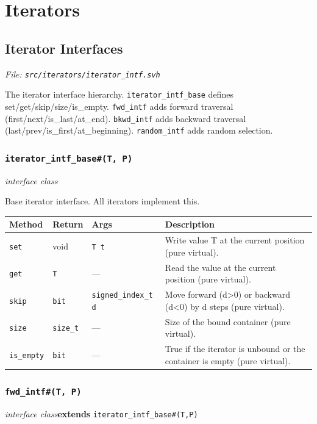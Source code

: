 \documentclass[11pt,letterpaper]{report}
\begin{document}
\chapter{Iterators}
\section{Iterator Interfaces}
\noindent\small\textit{File: \texttt{src/iterators/iterator\_intf.svh}}\par

The iterator interface hierarchy. \texttt{iterator\_intf\_base} defines set/get/skip/size/is\_empty. \texttt{fwd\_intf} adds forward traversal (first/next/is\_last/at\_end). \texttt{bkwd\_intf} adds backward traversal (last/prev/is\_first/at\_beginning). \texttt{random\_intf} adds random selection.

\subsection*{\texttt{iterator\_intf\_base\#(T, P)}}
\noindent\small\textit{interface class}\par

Base iterator interface. All iterators implement this.

\begin{xltabular}{\linewidth}{>{\small}p{1.35in} >{\small}p{1.25in} >{\small}p{0.95in} >{\small}X}
\toprule
\textbf{Method} & \textbf{Return} & \textbf{Args} & \textbf{Description} \\
\midrule
\endhead
\bottomrule
\endfoot
\texttt{set} & void & \texttt{T t} & Write value T at the current position (pure virtual). \\
\texttt{get} & \texttt{T} & --- & Read the value at the current position (pure virtual). \\
\texttt{skip} & \texttt{bit} & \texttt{signed\_index\_t d} & Move forward (d\textgreater{}0) or backward (d\textless{}0) by d steps (pure virtual). \\
\texttt{size} & \texttt{size\_t} & --- & Size of the bound container (pure virtual). \\
\texttt{is\_empty} & \texttt{bit} & --- & True if the iterator is unbound or the container is empty (pure virtual). \\
\end{xltabular}

\subsection*{\texttt{fwd\_intf\#(T, P)}}
\noindent\small\textit{interface class}\quad \textbf{extends} \texttt{iterator\_intf\_base\#(T,P)}\par
\end{document}
